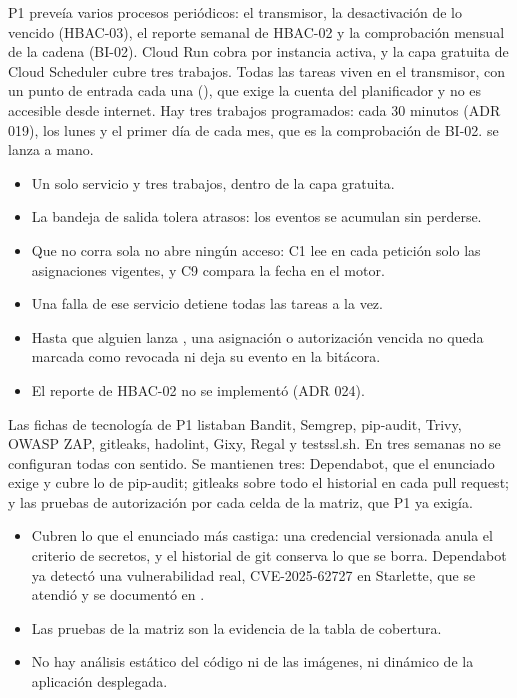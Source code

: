 \documentclass[11pt,a4paper]{article}
\theoremstyle{definition}
\theoremstyle{remark}
\begin{document}
\adrctx P1 preveía varios procesos periódicos: el transmisor, la desactivación
de lo vencido (HBAC-03), el reporte semanal de HBAC-02 y la comprobación
mensual de la cadena (BI-02). Cloud Run cobra por instancia activa, y la capa
gratuita de Cloud Scheduler cubre tres trabajos.
\adrdec Todas las tareas viven en el transmisor, con un punto de entrada cada
una (), que exige la cuenta del planificador y no
es accesible desde internet. Hay tres trabajos programados:
 cada 30 minutos (ADR 019),  los lunes y
 el primer día de cada mes, que es la comprobación de BI-02.
 se lanza a mano.
\adrpos
\begin{itemize}
  \item Un solo servicio y tres trabajos, dentro de la capa gratuita.
  \item La bandeja de salida tolera atrasos: los eventos se acumulan sin
    perderse.
  \item Que  no corra sola no abre ningún acceso: C1 lee en cada
    petición solo las asignaciones vigentes, y C9 compara la fecha en el motor.
\end{itemize}
\adrneg
\begin{itemize}
  \item Una falla de ese servicio detiene todas las tareas a la vez.
  \item Hasta que alguien lanza , una asignación o autorización
    vencida no queda marcada como revocada ni deja su evento en la bitácora.
  \item El reporte de HBAC-02 no se implementó (ADR 024).
\end{itemize}

\adrctx Las fichas de tecnología de P1 listaban Bandit, Semgrep, pip-audit,
Trivy, OWASP ZAP, gitleaks, hadolint, Gixy, Regal y testssl.sh. En tres
semanas no se configuran todas con sentido.
\adrdec Se mantienen tres: Dependabot, que el enunciado exige y cubre lo de
pip-audit; gitleaks sobre todo el historial en cada pull request; y las
pruebas de autorización por cada celda de la matriz, que P1 ya exigía.
\adrpos
\begin{itemize}
  \item Cubren lo que el enunciado más castiga: una credencial versionada
    anula el criterio de secretos, y el historial de git conserva lo que se
    borra. Dependabot ya detectó una vulnerabilidad real, CVE-2025-62727 en
    Starlette, que se atendió y se documentó en .
  \item Las pruebas de la matriz son la evidencia de la tabla de cobertura.
\end{itemize}
\adrneg
\begin{itemize}
  \item No hay análisis estático del código ni de las imágenes, ni dinámico
    de la aplicación desplegada.
\end{itemize}
\end{document}

